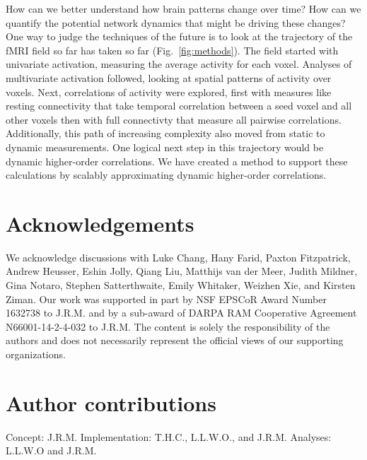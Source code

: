 \documentclass[english]{article}
\begin{document}
How can we better understand how brain patterns change over
time? How can we quantify the potential network dynamics that might be
driving these changes? One way to judge the techniques of the future is
to look at the trajectory of the fMRI field so far has taken so far
(Fig.~\ref{fig:methods}).  The field started with 
univariate activation, measuring the average activity for each voxel.
Analyses of multivariate activation followed, looking at spatial patterns of
activity over voxels. Next, correlations of activity were explored, first
with measures like resting connectivity that take temporal correlation
between a seed voxel and all other voxels then with full connectivty
that measure all pairwise correlations.  Additionally, this path of increasing
complexity also moved from static to dynamic measurements.  One
logical next step in this trajectory would be dynamic higher-order
correlations. We have created a method 
to support these calculations by scalably approximating dynamic higher-order
correlations.  

\section*{Acknowledgements}
We acknowledge discussions with Luke Chang, Hany Farid, Paxton
Fitzpatrick, Andrew Heusser, Eshin Jolly, Qiang Liu, Matthijs van der
Meer, Judith Mildner, Gina Notaro, Stephen Satterthwaite, Emily
Whitaker, Weizhen Xie, and Kirsten Ziman. Our work was supported in
part by NSF EPSCoR Award Number 1632738 to J.R.M. and by a sub-award
of DARPA RAM Cooperative Agreement N66001-14-2-4-032 to J.R.M.  The
content is solely the responsibility of the authors and does not
necessarily represent the official views of our supporting
organizations.

\section*{Author contributions}
Concept: J.R.M.  Implementation: T.H.C., L.L.W.O., and
J.R.M.  Analyses: L.L.W.O and J.R.M.



\end{document}
